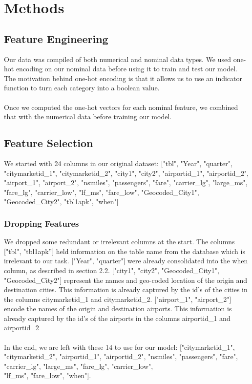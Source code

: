 \documentclass{article}
\begin{document}
\section{Methods}

\subsection{Feature Engineering}

Our data was compiled of both numerical and nominal data types. We used one-hot encoding on our nominal data before using it to train and test our model. The motivation behind one-hot encoding is that it allows us to use an indicator function to turn each category into a boolean value. \\\\
Once we computed the one-hot vectors for each nominal feature, we combined that with the numerical data before training our model. 
\subsection{Feature Selection}
We started with 24 columns in our original dataset:
["tbl", "Year", "quarter", "citymarketid\_1", "citymarketid\_2", "city1", "city2", 
"airportid\_1", "airportid\_2", "airport\_1", "airport\_2", "nsmiles", "passengers", 
"fare", "carrier\_lg", "large\_ms", "fare\_lg", "carrier\_low", "lf\_ms", "fare\_low",
"Geocoded\_City1", 
\\"Geocoded\_City2", "tbl1apk", "when"]
\subsubsection{Dropping Features}
We dropped some redundant or irrelevant columns at the start. The columns ["tbl", "tbl1apk”] held information on the table name from the database which is irrelevant to our task. ["Year", "quarter"] were already consolidated into the when column, as described in section 2.2. ["city1", "city2", "Geocoded\_City1", "Geocoded\_City2"] represent the names and geo-coded location of the origin and destination cities. This information is already captured by the id’s of the cities in the columns citymarketid\_1 and citymarketid\_2. ["airport\_1", "airport\_2"] encode the names of the origin and destination airports. This information is already captured by the id’s of the airports in the columns airportid\_1 and airportid\_2
\\\\
In the end, we are left with these 14 to use for our model: ["citymarketid\_1", "citymarketid\_2", "airportid\_1", "airportid\_2", "nsmiles", "passengers", "fare", "carrier\_lg", "large\_ms", "fare\_lg", "carrier\_low", 
\\"lf\_ms", "fare\_low", "when"].
\end{document}
